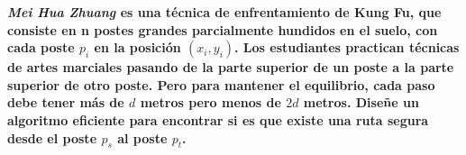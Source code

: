 \textbf{
    \textit{Mei Hua Zhuang} es una técnica de enfrentamiento
    de Kung Fu, que consiste en n postes grandes parcialmente
    hundidos en el suelo, con cada poste $p_i$ en la posición
    $(x_i,y_i)$. Los estudiantes practican técnicas de artes 
    marciales pasando de la parte superior de un poste a la 
    parte superior de otro poste. Pero para mantener el equilibrio,
    cada paso debe tener más de $d$ metros pero menos de $2d$ metros.
    Diseñe un algoritmo eficiente para encontrar si es que existe
    una ruta segura desde el poste $p_s$ al poste $p_t$.
}\vspace{.2cm}
\textcolor{bibi}{}
\begin{quote}
\end{quote}